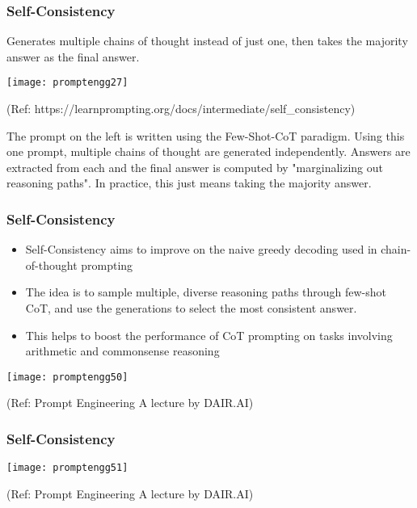 


\begin{frame}[fragile]\frametitle{Self-Consistency}

Generates multiple chains of thought instead of just one, then takes the majority answer as the final answer.

\begin{center}
\texttt{[image: promptengg27]}

{\tiny (Ref: https://learnprompting.org/docs/intermediate/self\_consistency)}

\end{center}		

The prompt on the left is written using the Few-Shot-CoT paradigm. Using this one prompt, multiple chains of thought are generated independently. Answers are extracted from each and the final answer is computed by "marginalizing out reasoning paths". In practice, this just means taking the majority answer.

\end{frame}

\begin{frame}[fragile]\frametitle{Self-Consistency}

\begin{itemize}
\item Self-Consistency aims to improve on the naive greedy 
decoding used in chain-of-thought prompting 
\item The idea is to sample multiple, diverse reasoning paths 
through few-shot CoT, and use the generations to select 
the most consistent answer.  
\item  This helps to boost the performance of CoT prompting on 
tasks involving arithmetic and commonsense reasoning
\end{itemize}	

\begin{center}
\texttt{[image: promptengg50]}

{\tiny (Ref: Prompt Engineering A lecture by DAIR.AI)}

\end{center}	

\end{frame}


\begin{frame}[fragile]\frametitle{Self-Consistency}

\begin{center}
\texttt{[image: promptengg51]}

{\tiny (Ref: Prompt Engineering A lecture by DAIR.AI)}

\end{center}	

\end{frame}


